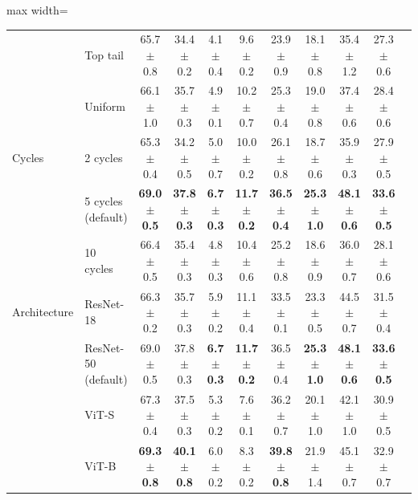 \begin{table}[t]
\begin{adjustbox}{max width=\textwidth}
\begin{tabular}{l l c c c c c c c c c}
 & Top tail & 65.7 {\scriptsize$\pm$ 0.8} & 34.4 {\scriptsize$\pm$ 0.2} & 4.1 {\scriptsize$\pm$ 0.4} & 9.6 {\scriptsize$\pm$ 0.2} & 23.9 {\scriptsize$\pm$ 0.9} & 18.1 {\scriptsize$\pm$ 0.8} & 35.4 {\scriptsize$\pm$ 1.2} & 27.3 {\scriptsize$\pm$ 0.6} \\
 & Uniform & 66.1 {\scriptsize$\pm$ 1.0} & 35.7 {\scriptsize$\pm$ 0.3} & 4.9 {\scriptsize$\pm$ 0.1} & 10.2 {\scriptsize$\pm$ 0.7} & 25.3 {\scriptsize$\pm$ 0.4} & 19.0 {\scriptsize$\pm$ 0.8} & 37.4 {\scriptsize$\pm$ 0.6} & 28.4 {\scriptsize$\pm$ 0.6} \\
\midrule
Cycles & 2 cycles & 65.3 {\scriptsize$\pm$ 0.4} & 34.2 {\scriptsize$\pm$ 0.5} & 5.0 {\scriptsize$\pm$ 0.7} & 10.0 {\scriptsize$\pm$ 0.2} & 26.1 {\scriptsize$\pm$ 0.8} & 18.7 {\scriptsize$\pm$ 0.6} & 35.9 {\scriptsize$\pm$ 0.3} & 27.9 {\scriptsize$\pm$ 0.5} \\
 & 5 cycles (default) & \textbf{69.0 {\scriptsize$\pm$ 0.5}} & \textbf{37.8 {\scriptsize$\pm$ 0.3}} & \textbf{6.7 {\scriptsize$\pm$ 0.3}} & \textbf{11.7 {\scriptsize$\pm$ 0.2}} & \textbf{36.5 {\scriptsize$\pm$ 0.4}} & \textbf{25.3 {\scriptsize$\pm$ 1.0}} & \textbf{48.1 {\scriptsize$\pm$ 0.6}} & \textbf{33.6 {\scriptsize$\pm$ 0.5}} \\
 & 10 cycles & 66.4 {\scriptsize$\pm$ 0.5} & 35.4 {\scriptsize$\pm$ 0.3} & 4.8 {\scriptsize$\pm$ 0.3} & 10.4 {\scriptsize$\pm$ 0.6} & 25.2 {\scriptsize$\pm$ 0.8} & 18.6 {\scriptsize$\pm$ 0.9} & 36.0 {\scriptsize$\pm$ 0.7} & 28.1 {\scriptsize$\pm$ 0.6} \\
\midrule
Architecture & ResNet-18 & 66.3 {\scriptsize$\pm$ 0.2} & 35.7 {\scriptsize$\pm$ 0.3} & 5.9 {\scriptsize$\pm$ 0.2} & 11.1 {\scriptsize$\pm$ 0.4} & 33.5 {\scriptsize$\pm$ 0.1} & 23.3 {\scriptsize$\pm$ 0.5} & 44.5 {\scriptsize$\pm$ 0.7} & 31.5 {\scriptsize$\pm$ 0.4} \\
 & ResNet-50 (default) & 69.0 {\scriptsize$\pm$ 0.5} & 37.8 {\scriptsize$\pm$ 0.3} & \textbf{6.7 {\scriptsize$\pm$ 0.3}} & \textbf{11.7 {\scriptsize$\pm$ 0.2}} & 36.5 {\scriptsize$\pm$ 0.4} & \textbf{25.3 {\scriptsize$\pm$ 1.0}} & \textbf{48.1 {\scriptsize$\pm$ 0.6}} & \textbf{33.6 {\scriptsize$\pm$ 0.5}} \\
 & ViT-S & 67.3 {\scriptsize$\pm$ 0.4} & 37.5 {\scriptsize$\pm$ 0.3} & 5.3 {\scriptsize$\pm$ 0.2} & 7.6 {\scriptsize$\pm$ 0.1} & 36.2 {\scriptsize$\pm$ 0.7} & 20.1 {\scriptsize$\pm$ 1.0} & 42.1 {\scriptsize$\pm$ 1.0} & 30.9 {\scriptsize$\pm$ 0.5} \\
 & ViT-B & \textbf{69.3 {\scriptsize$\pm$ 0.8}} & \textbf{40.1 {\scriptsize$\pm$ 0.8}} & 6.0 {\scriptsize$\pm$ 0.2} & 8.3 {\scriptsize$\pm$ 0.2} & \textbf{39.8 {\scriptsize$\pm$ 0.8}} & 21.9 {\scriptsize$\pm$ 1.4} & 45.1 {\scriptsize$\pm$ 0.7} & 32.9 {\scriptsize$\pm$ 0.7} \\
\bottomrule
\end{tabular}
\end{adjustbox}
\end{table}
